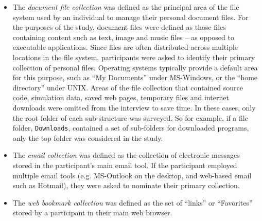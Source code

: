 \begin{itemize}

\item The \textit{document file collection} was defined as the principal area of the file system used by an individual to manage their personal document files. For the purposes of the study, document files were defined as those files containing content such as text, image and music files -- as opposed to executable applications. Since files are often distributed across multiple locations in the file system, participants were asked to identify their primary collection of personal files. Operating systems typically provide a default area for this purpose, such as ``My Documents'' under MS-Windows, or the ``home directory'' under UNIX.  Areas of the file collection that contained source code, simulation data, saved web pages, temporary files and internet downloads were omitted from the interview to save time.  In these cases, only the root folder of each sub-structure was surveyed.  So for example, if a file folder, \texttt{Downloads}, contained a set of sub-folders for downloaded programs, only the top folder was considered in the study.  %


\item The \textit{email collection} was defined as the collection of electronic messages stored in the participant's main email tool.  If the participant employed multiple email tools (e.g. MS-Outlook on the desktop, and web-based email such as Hotmail), they were asked to nominate their primary collection.

\item The \textit{web bookmark collection} was defined as the set of ``links'' or ``Favorites'' stored by a participant in their main web browser.

\end{itemize}

